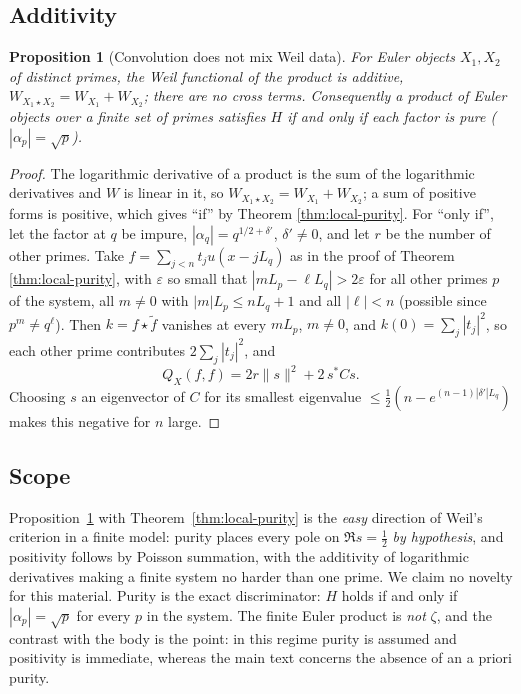 \documentclass[11pt,reqno]{amsart}
\newtheorem{proposition}[theorem]{Proposition}
\theoremstyle{definition}
\newcommand{\half}{\tfrac12}
\begin{document}
\subsection{Additivity}
\begin{proposition}[Convolution does not mix Weil data]\label{prop:crosszero}
For Euler objects $X_1,X_2$ of distinct primes, the Weil functional of the product is
additive, $W_{X_1\star X_2}=W_{X_1}+W_{X_2}$; there are no cross terms.
Consequently a product of Euler objects over a finite set of primes satisfies
$H$ if and only if each factor is pure \textnormal{(}$|\alpha_p|=\sqrt p$\textnormal{)}.
\end{proposition}
\begin{proof}
The logarithmic derivative of a product is the sum of the logarithmic
derivatives and $W$ is linear in it, so $W_{X_1\star X_2}=W_{X_1}+W_{X_2}$; a sum
of positive forms is positive, which gives ``if'' by Theorem
\ref{thm:local-purity}. For ``only if'', let the factor at $q$ be impure,
$|\alpha_q|=q^{1/2+\delta'}$, $\delta'\neq0$, and let $r$ be the number of other
primes. Take $f=\sum_{j<n}t_ju(x-jL_q)$ as in the proof of Theorem
\ref{thm:local-purity}, with $\varepsilon$ so small that
$|mL_{p}-\ell L_q|>2\varepsilon$ for all other primes $p$ of the system, all
$m\neq0$ with $|m|L_p\le nL_q+1$ and all $|\ell|<n$ (possible since $p^m\neq q^\ell$).
Then $k=f\star\tilde f$ vanishes at every $mL_p$, $m\neq0$, and
$k(0)=\sum_j|t_j|^2$, so each other prime contributes $2\sum_j|t_j|^2$, and
\[
Q_X(f,f)=2r\|s\|^2+2\,s^*Cs .
\]
Choosing $s$ an eigenvector of $C$ for its smallest eigenvalue
$\le\half(n-e^{(n-1)|\delta'|L_q})$ makes this negative for $n$ large.
\end{proof}

\subsection{Scope}
Proposition~\ref{prop:crosszero} with Theorem~\ref{thm:local-purity} is the
\emph{easy} direction of Weil's criterion \cite{Weil1952} in a finite model:
purity places every pole on $\Re s=\half$ \emph{by hypothesis}, and positivity
follows by Poisson summation, with the additivity of logarithmic derivatives
making a finite system no harder than one prime. We claim no novelty for this
material. Purity is the exact discriminator: $H$ holds if and only if
$|\alpha_p|=\sqrt p$ for every $p$ in the system. The finite Euler product is
\emph{not} $\zeta$, and the contrast with the body is the point: in this regime
purity is assumed and positivity is immediate, whereas the main text concerns the
absence of an a priori purity.
\end{document}
